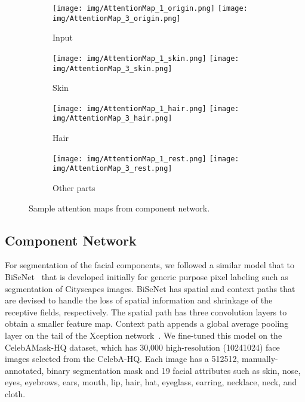 \documentclass[10pt,twocolumn,letterpaper]{article}
\newcommand\SizeFigAttentionMap{0.11}     \newcommand\SizeFigCompareHRLarge{0.18}     \newcommand\SizeFigCompareHRSmall{0.443}    \newcommand\SizeFigCompareLR{0.138}
\begin{document}
\begin{figure}[t]
\begin{center}
    \begin{subfigure}[b]{\SizeFigAttentionMap\textwidth}
        \texttt{[image: img/AttentionMap\_1\_origin.png]}
\texttt{[image: img/AttentionMap\_3\_origin.png]}
        \caption{Input}
    \end{subfigure}
    \begin{subfigure}[b]{\SizeFigAttentionMap\textwidth}
        \texttt{[image: img/AttentionMap\_1\_skin.png]}
\texttt{[image: img/AttentionMap\_3\_skin.png]}
        \caption{Skin}
    \end{subfigure}
    \begin{subfigure}[b]{\SizeFigAttentionMap\textwidth}
        \texttt{[image: img/AttentionMap\_1\_hair.png]}
\texttt{[image: img/AttentionMap\_3\_hair.png]}
        \caption{Hair}
    \end{subfigure}
    \begin{subfigure}[b]{\SizeFigAttentionMap\textwidth}
        \texttt{[image: img/AttentionMap\_1\_rest.png]}
\texttt{[image: img/AttentionMap\_3\_rest.png]}
        \caption{Other parts}
    \end{subfigure}
\end{center}
\vspace{-5mm}
\caption{Sample attention maps from component network.}
\label{fig:attemtionmaps}
\end{figure}
 
\subsection{Component Network}

For segmentation of the facial components, we followed a similar model that to BiSeNet~\cite{Bisenet2018} that is developed initially for generic purpose pixel labeling such as segmentation of Cityscapes images. BiSeNet has spatial and context paths that are devised to handle the loss of spatial information and shrinkage of the receptive fields, respectively. The spatial path has three convolution layers to obtain a smaller feature map. Context path appends a global average pooling layer on the tail of the Xception network~\cite{chollet2017}. We fine-tuned this model on the CelebAMask-HQ dataset, which has 30,000 high-resolution (10241024) face images selected from the CelebA-HQ. Each image has a 512512, manually-annotated, binary segmentation mask and 19 facial attributes such as skin, nose, eyes, eyebrows, ears, mouth, lip, hair, hat, eyeglass, earring, necklace, neck, and cloth. 
\end{document}
